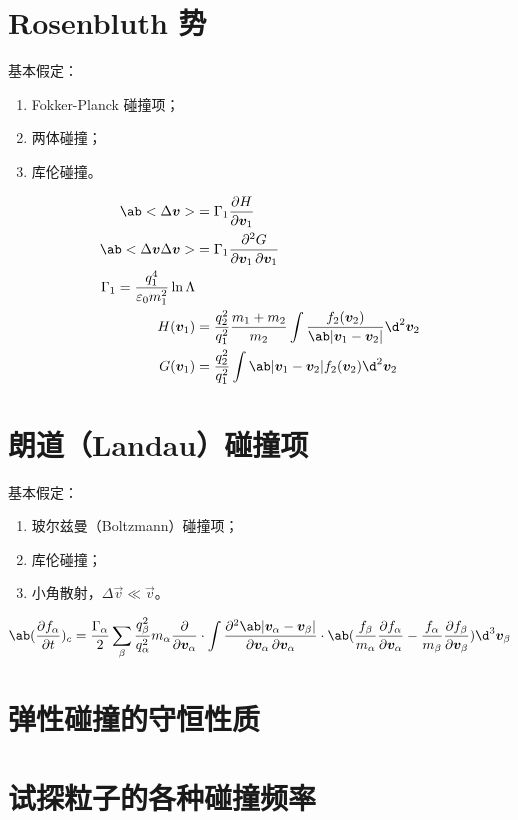 \section{Rosenbluth 势}

基本假定：
\begin{enumerate}
    \item Fokker-Planck 碰撞项；
    \item 两体碰撞；
    \item 库伦碰撞。
\end{enumerate}

\begin{subequations}\begin{align}
\ab<\Delta\vec{v}> &= \Gamma_1 \pdv{H}{\vec{v}_1} \\
\ab<\Delta\vec{v}\Delta\vec{v}> &=
    \Gamma_1 \pdv{G}{\vec{v}_1,\vec{v}_1} \\
\Gamma_1 = \frac{q_1^4}{\varepsilon_0 m_1^2} \ln\Lambda \\
H(\vec{v}_1) &= \frac{q_2^2}{q_1^2} \frac{m_1 + m_2}{m_2}
\int \frac{f_2(\vec{v}_2)}{\ab|\vec{v}_1 - \vec{v}_2|} \d^2\vec{v}_2 \\
G(\vec{v}_1) &= \frac{q_2^2}{q_1^2}
\int \ab|\vec{v}_1 - \vec{v}_2| f_2(\vec{v}_2) \d^2\vec{v}_2 \\
\end{align}\end{subequations}

\section{朗道（Landau）碰撞项}

基本假定：
\begin{enumerate}
    \item 玻尔兹曼（Boltzmann）碰撞项；
    \item 库伦碰撞；
    \item 小角散射，$\Delta\vec{v}\ll\vec{v}$。
\end{enumerate}

\begin{equation}
\ab(\pdv{f_\alpha}{t})_c =
\frac{\Gamma_\alpha}{2} \sum_\beta \frac{q_\beta^2}{q_\alpha^2} m_\alpha
\pdv{}{\vec{v}_\alpha} \cdot
\int \pdv{\ab|\vec{v}_\alpha-\vec{v}_\beta|}{\vec{v}_\alpha,\vec{v}_\alpha}
\cdot \ab(
    \frac{f_\beta}{m_\alpha} \pdv{f_\alpha}{\vec{v}_\alpha}
    - \frac{f_\alpha}{m_\beta} \pdv{f_\beta}{\vec{v}_\beta}
) \d^3\vec{v}_\beta
\end{equation}

\section{弹性碰撞的守恒性质}

\section{试探粒子的各种碰撞频率}
